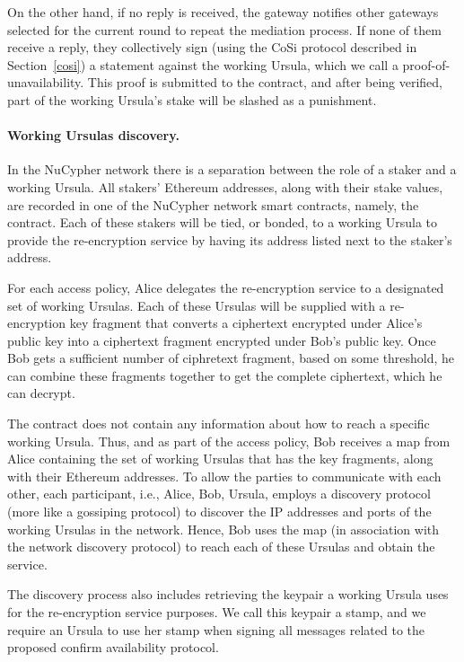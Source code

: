 On the other hand, if no reply is received, the gateway notifies other gateways selected for the current round to repeat the mediation process. If none of them receive a reply, they collectively sign (using the CoSi protocol described in Section~\ref{cosi}) a statement against the working Ursula, which we call a proof-of-unavailability. This proof is submitted to the \stakeescrow contract, and after being verified, part of the working Ursula's stake will be slashed as a punishment. 


\paragraph{\bf Working Ursulas discovery.} 
In the NuCypher network there is a separation between the role of a staker and a working Ursula. All stakers' Ethereum addresses, along with their stake values, are recorded in one of the NuCypher network smart contracts, namely, the \stakeescrow contract. Each of these stakers will be tied, or bonded, to a working Ursula to provide the re-encryption service by having its address listed next to the staker's address. 


For each access policy, Alice delegates the re-encryption service to a designated set of working Ursulas. Each of these Ursulas will be supplied with a re-encryption key fragment that converts a ciphertext encrypted under Alice's public key into a ciphertext fragment encrypted under Bob's public key. Once Bob gets a sufficient number of ciphretext fragment, based on some threshold, he can combine these fragments together to get the complete ciphertext, which he can decrypt. 


The \stakeescrow contract does not contain any information about how to reach a specific working Ursula. Thus, and as part of the access policy, Bob receives a map from Alice containing the set of working Ursulas that has the key fragments, along with their Ethereum addresses. To allow the parties to communicate with each other, each participant, i.e., Alice, Bob, Ursula, employs a discovery protocol (more like a gossiping protocol) to discover the IP addresses and ports of the working Ursulas in the network. Hence, Bob uses the map (in association with the network discovery protocol) to reach each of these Ursulas and obtain the service. 


The discovery process also includes retrieving the keypair a working Ursula uses for the re-encryption service purposes. We call this keypair a stamp, and we require an Ursula to use her stamp when signing all messages related to the proposed confirm availability protocol. 


